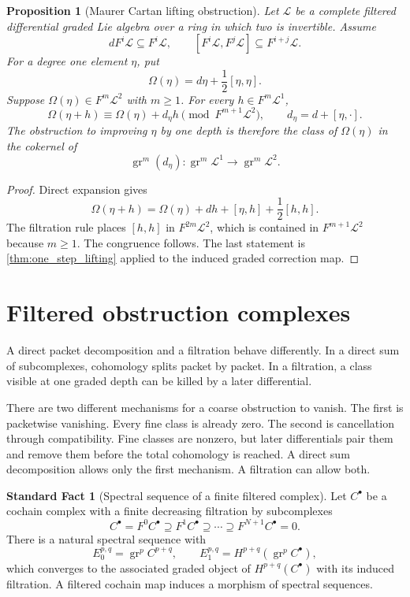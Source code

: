 \documentclass{aomart}
\newtheorem{proposition}[proposition]{Proposition}
\theoremstyle{definition}
\newtheorem{standardfact}[standardfact]{Standard Fact}
\theoremstyle{remark}
\newcommand{\Lcal}{\mathcal L}
\newcommand{\gr}{\operatorname{gr}}
\begin{document}
\begin{proposition}[Maurer Cartan lifting obstruction]\label{prop:maurer_cartan_lifting}
Let $\Lcal$ be a complete filtered differential graded Lie algebra over a ring in which two is invertible.  Assume
\[
dF^i\Lcal\subseteq F^i\Lcal,
\qquad
[F^i\Lcal,F^j\Lcal]\subseteq F^{i+j}\Lcal.
\]
For a degree one element $\eta$, put
\[
\Omega(\eta)=d\eta+\frac12[\eta,\eta].
\]
Suppose $\Omega(\eta)\in F^m\Lcal^2$ with $m\ge1$.  For every $h\in F^m\Lcal^1$,
\[
\Omega(\eta+h)
\equiv
\Omega(\eta)+d_\eta h
\pmod{F^{m+1}\Lcal^2},
\qquad
d_\eta=d+[\eta,\mathord\cdot].
\]
The obstruction to improving $\eta$ by one depth is therefore the class of $\Omega(\eta)$ in the cokernel of
\[
\gr^m(d_\eta):
\gr^m\Lcal^1
\longrightarrow
\gr^m\Lcal^2.
\]
\end{proposition}

\begin{proof}
Direct expansion gives
\[
\Omega(\eta+h)
=
\Omega(\eta)+dh+[\eta,h]+\frac12[h,h].
\]
The filtration rule places $[h,h]$ in $F^{2m}\Lcal^2$, which is contained in $F^{m+1}\Lcal^2$ because $m\ge1$.  The congruence follows.  The last statement is \cref{thm:one_step_lifting} applied to the induced graded correction map.
\end{proof}

\section{Filtered obstruction complexes}\label{sec:obstruction_spectral_sequence}

A direct packet decomposition and a filtration behave differently.  In a direct sum of subcomplexes, cohomology splits packet by packet.  In a filtration, a class visible at one graded depth can be killed by a later differential.


There are two different mechanisms for a coarse obstruction to vanish.  The first is packetwise vanishing.  Every fine class is already zero.  The second is cancellation through compatibility.  Fine classes are nonzero, but later differentials pair them and remove them before the total cohomology is reached.  A direct sum decomposition allows only the first mechanism.  A filtration can allow both.

\begin{standardfact}[Spectral sequence of a finite filtered complex]\label{fact:filtered_spectral_sequence}
Let $C^\bullet$ be a cochain complex with a finite decreasing filtration by subcomplexes
\[
C^\bullet=F^0C^\bullet\supseteq F^1C^\bullet\supseteq\cdots\supseteq F^{N+1}C^\bullet=0.
\]
There is a natural spectral sequence with
\[
E_0^{p,q}=\gr^pC^{p+q},
\qquad
E_1^{p,q}=H^{p+q}(\gr^pC^\bullet),
\]
which converges to the associated graded object of $H^{p+q}(C^\bullet)$ with its induced filtration.  A filtered cochain map induces a morphism of spectral sequences.
\end{standardfact}
\end{document}
